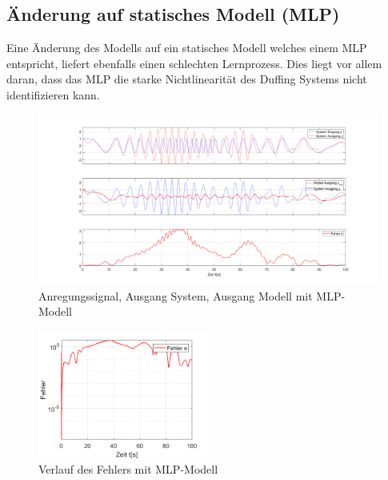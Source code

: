 \documentclass[paper=a4, fontsize=11pt]{scrartcl} %
\numberwithin{equation}{section} %
\numberwithin{figure}{section} %
\numberwithin{table}{section} %
\begin{document}
\subsection{Änderung auf statisches Modell (MLP)}
Eine Änderung des Modells auf ein statisches Modell welches einem MLP entspricht, liefert ebenfalls einen schlechten Lernprozess. Dies liegt vor allem daran, dass das MLP die starke Nichtlinearität des Duffing Systems nicht identifizieren kann.
\begin{figure}[!h]
	\centering
		\includegraphics[width=1.00\textwidth]{./MLP_Identifikation.png}
	\caption{Anregungssignal, Ausgang System, Ausgang Modell mit MLP-Modell}
	\label{fig:MLP}
\end{figure}

\begin{figure}
	\centering
		\includegraphics[width=0.5\textwidth]{./MLP_Identifikation_2.png}
	\caption{Verlauf des Fehlers mit MLP-Modell}
	\label{fig:MLP2}
\end{figure}



\end{document}
